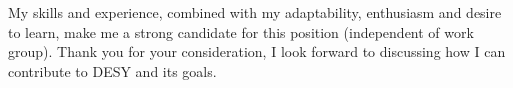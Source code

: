 \documentclass[11pt, a4paper]{awesome-cv}
\begin{document}
\begin{cvletter}
My skills and experience, combined with my adaptability, enthusiasm and desire to learn, make me a strong candidate for this position (independent of work group). Thank you for your consideration, I look forward to discussing how I can contribute to DESY and its goals.

\end{cvletter}


\makeletterclosing
\end{document}
